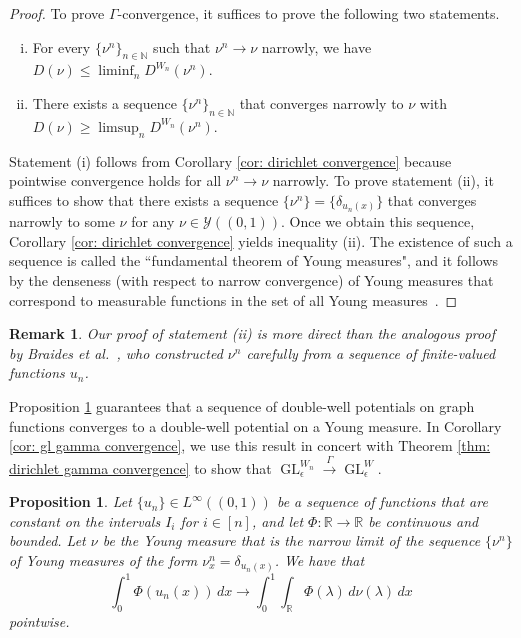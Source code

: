 \documentclass[11pt]{amsart}
\newtheorem{proposition}{Proposition}[section]
\newtheorem{remark}{Remark}[section]
\def\R{\mathbb{R}}
\def\N{\mathbb{N}}
\def\ep{\epsilon}
\def\ra{\rightarrow}
\def\gamra{\stackrel{\Gamma}{\longrightarrow}}
\def\GL{\operatorname{GL}}
\numberwithin{equation}{section}
\begin{document}
{{\begin{proof}
To prove $\Gamma$-convergence, it suffices to prove the following two statements.
\begin{enumerate}[(i)]
    \item For every $\{\nu^n\}_{n\in \N}$ such that $\nu^n \ra \nu$ narrowly, we have $D(\nu) \leq \liminf_{n} D^{W_n}(\nu^n)$. 
    \item There exists a sequence $\{\nu^n\}_{n\in \N}$ that converges narrowly to $\nu$ with 
    \\$D(\nu) \geq \limsup_{n} D^{W_n}(\nu^n)$. 
\end{enumerate}


Statement (i) follows from Corollary \ref{cor: dirichlet convergence} because pointwise convergence holds for all $\nu^n \ra \nu$ narrowly. To prove statement (ii), it suffices to show that there exists a sequence {$\{\nu^n\} = \{\delta_{u_n(x)}\}$} that converges narrowly to some $\nu$ for any $\nu \in \mathcal{Y}((0,1))$. Once we obtain this sequence, Corollary \ref{cor: dirichlet convergence} yields inequality (ii). The existence of such a sequence {is called the ``fundamental theorem of Young measures"}, and it follows by the denseness {(with respect to narrow convergence)} of Young measures that correspond to measurable functions in the set of all Young measures~\cite[Proposition 8]{valadier1990young}. 
\end{proof}


\begin{remark}\label{direct}
Our proof of statement (ii) is more direct than the analogous proof by Braides et al.~\cite[Theorem 12]{braides2020cut}, who constructed $\nu^n$ carefully from a sequence of finite-valued functions $u_n$.
\end{remark}


Proposition \ref{prop: double-well convergence} {guarantees} that a sequence of double-well potentials on graph functions converges to a double-well potential on a Young measure. 
In Corollary \ref{cor: gl gamma convergence}, we use this result in concert with Theorem \ref{thm: dirichlet gamma convergence} to show that $\GL^{W_n}_\ep \gamra \GL^W_\ep$. 

\begin{proposition} \label{prop: double-well convergence}
    Let {$\{u_n\} \in L^\infty((0,1))$} be a sequence of functions that are constant on the intervals $I_i$
    for $i \in [n]$, and let $\Phi: \R \ra \R$ be continuous and bounded. Let $\nu$ be the Young measure that is the narrow limit of the sequence {$\{\nu^n\}$} of Young measures of the form $\nu^n_x = \delta_{u_n(x)}$.
    We have that
\begin{equation}
    \int_0^1 \Phi(u_n(x)) \,dx \ra \int_0^1 \int_{\R} \Phi(\lambda) \, d\nu(\lambda) \,dx  
 \end{equation}   
    pointwise. 
\end{proposition}



}}
\end{document}
